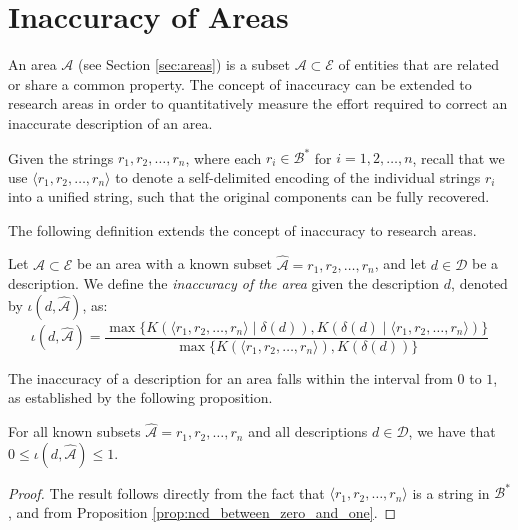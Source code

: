 %
%

\section{Inaccuracy of Areas}
\label{sec:inaccuracy_areas}

An area $\mathcal{A}$ (see Section \ref{sec:areas}) is a subset $\mathcal{A} \subset \mathcal{E}$ of entities that are related or share a common property. The concept of inaccuracy can be extended to research areas in order to quantitatively measure the effort required to correct an inaccurate description of an area.

Given the strings $r_1, r_2, \ldots, r_n$, where each $r_i \in \mathcal{B}^\ast$ for $i = 1, 2, \ldots, n$, recall that we use $\langle r_1, r_2, \ldots, r_n \rangle$ to denote a self-delimited encoding of the individual strings $r_i$ into a unified string, such that the original components can be fully recovered.

The following definition extends the concept of inaccuracy to research areas.

\begin{definition}
Let $\mathcal{A} \subset \mathcal{E}$ be an area with a known subset $\hat{\mathcal{A}} = {r_1, r_2, \ldots, r_n}$, and let $d \in \mathcal{D}$ be a description. We define the \emph{inaccuracy of the area} given the description $d$, denoted by $\iota(d, \hat{\mathcal{A}})$, as:
\[
\iota(d, \hat{\mathcal{A}}) = \frac{ \max\{ K \left( \langle r_1, r_2, \ldots, r_n \rangle \mid \delta(d) \right), K \left( \delta(d) \mid \langle r_1, r_2, \ldots, r_n \rangle \right) \} } { \max\{ K(\langle r_1, r_2, \ldots, r_n \rangle), K \left(\delta(d) \right) \} }
\]
\end{definition}

The inaccuracy of a description for an area falls within the interval from $0$ to $1$, as established by the following proposition.

\begin{proposition}
\label{prop:inaccuracy:inaccuracy:range}
For all known subsets $\hat{\mathcal{A}} = {r_1, r_2, \ldots, r_n}$ and all descriptions $d \in \mathcal{D}$, we have that $0 \leq \iota(d, \hat{\mathcal{A}}) \leq 1$.
\end{proposition}
\begin{proof}
The result follows directly from the fact that $\langle r_1, r_2, \ldots, r_n \rangle$ is a string in $\mathcal{B}^\ast$, and from Proposition \ref{prop:ncd_between_zero_and_one}.
\end{proof}

